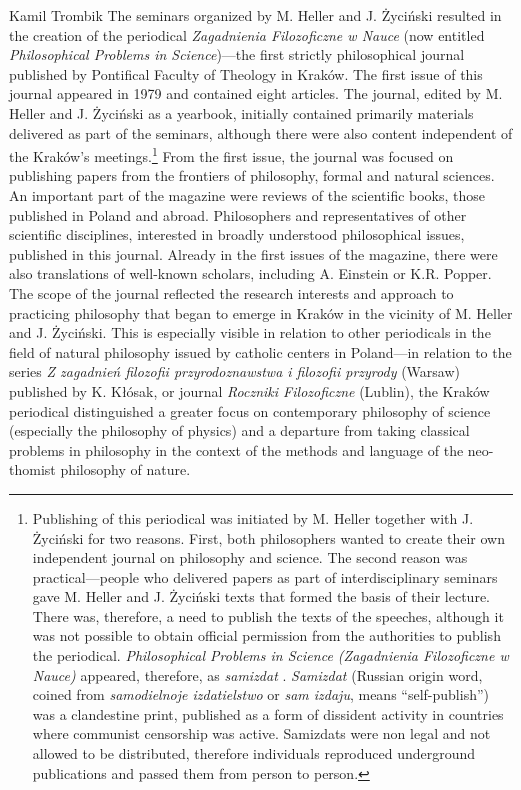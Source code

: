 \begin{artengenv}{Kamil Trombik}
The seminars organized by M. Heller and J. Życiński resulted in the creation of the periodical \textit{Zagadnienia
Filozoficzne w Nauce} (now entitled \textit{Philosophical Problems in Science})---the first strictly
philosophical journal published by Pontifical Faculty of Theology in Kraków. The first issue of this journal appeared
in 1979 and contained eight articles. The journal, edited by M. Heller and J. Życiński as a yearbook, initially
contained primarily materials delivered as part of the seminars, although there were also content independent of the
Kraków's meetings.\footnote{Publishing of this periodical was initiated by M. Heller together with J. Życiński for two
reasons. First, both philosophers wanted to create their own independent journal on philosophy and science. The second
reason was practical---people who delivered papers as part of interdisciplinary seminars gave M. Heller and J. Życiński
texts that formed the basis of their lecture. There was, therefore, a need to publish the texts of the speeches,
although it was not possible to obtain official permission from the authorities to publish the periodical.
\textit{Philosophical Problems in Science (Zagadnienia Filozoficzne w Nauce)} appeared, therefore, as \textit{samizdat}
\parencite{heller_interview_2017}.
\textit{Samizdat} (Russian origin word, coined from \textit{samodielnoje
izdatielstwo} or \textit{sam izdaju}, means ``self-publish'') was a clandestine print, published as a form of dissident
activity in countries where communist censorship was active. Samizdats were non legal and not allowed to be
distributed, therefore individuals reproduced underground publications and passed them from person to person. } From
the first issue, the journal was focused on publishing papers from the frontiers of philosophy, formal and natural
sciences. An important part of the magazine were reviews of the scientific books, those published in Poland and abroad.
Philosophers and representatives of other scientific disciplines, interested in broadly understood philosophical
issues, published in this journal. Already in the first issues of the magazine, there were also translations of
well-known scholars, including A. Einstein or K.R. Popper. The scope of the journal reflected the research interests
and approach to practicing philosophy that began to emerge in Kraków in the vicinity of M. Heller and J. Życiński. This
is especially visible in relation to other periodicals in the field of natural philosophy issued by catholic centers in
Poland---in relation to the series \textit{Z zagadnień filozofii przyrodoznawstwa i filozofii przyrody} (Warsaw)
published by K. Kłósak, or journal \textit{Roczniki Filozoficzne }(Lublin), the Kraków periodical distinguished a
greater focus on contemporary philosophy of science (especially the philosophy of physics) and a departure from taking
classical problems in philosophy in the context of the methods and language of the neo-thomist philosophy of nature.


\end{artengenv}
